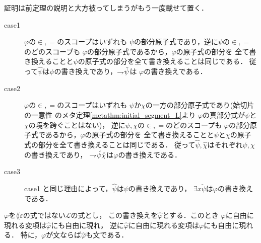 	\begin{metaprf}
		証明は前定理の説明と大方被ってしまうがもう一度載せて置く．
		\begin{description}
			\item[case1] $\varphi$の$\in,=$のスコープはいずれも
				$\psi$の部分原子式であり，逆に$\psi$の$\in,=$のどのスコープも
				$\varphi$の部分原子式であるから，$\varphi$の原子式の部分を
				全て書き換えることと$\psi$の原子式の部分を全て書き換えることは同じである．
				従って$\hat{\psi}$は$\psi$の書き換えであり，$\rightharpoondown\hspace{-0.25em} \check{\psi}$は
				$\varphi$の書き換えである．
			
			\item[case2] $\varphi$の$\in,=$のスコープはいずれも
				$\psi$か$\chi$の一方の部分原子式であり(始切片の一意性
				のメタ定理\ref{metathm:initial_segment_L}より
				$\varphi$の真部分式が$\psi$と$\chi$の境を跨ぐことはない)，
				逆に$\psi,\chi$の$\in,=$のどのスコープも
				$\varphi$の部分原子式であるから，$\varphi$の原子式の部分を
				全て書き換えることと$\psi$と$\chi$の原子式の部分を全て書き換えることは同じである．
				従って$\hat{\psi},\hat{\chi}$はそれぞれ$\psi,\chi$の書き換えであり，
				$\rightharpoondown\hspace{-0.25em} \check{\psi} \check{\chi}$は$\varphi$の書き換えである．
				
			\item[case3] case1 と同じ理由によって，$\hat{\psi}$は$\psi$の書き換えであり，
				$\exists x \check{\psi}$は$\varphi$の書き換えである．
				\QED
		\end{description}
	\end{metaprf}
	
	\begin{screen}
		\begin{metathm}[書き換え後も自由な変項は増減しない]
		\label{metathm:variables_unchanged_after_rewriting}
			$\varphi$を$\lang{\varepsilon}$の式ではない$\mathcal{L}$の式とし，
			この書き換えを$\hat{\varphi}$とする．このとき
			$\varphi$に自由に現れる変項は$\hat{\varphi}$にも自由に現れ，
			逆に$\hat{\varphi}$に自由に現れる変項は$\varphi$にも自由に現れる．
			特に，$\varphi$が文ならば$\hat{\varphi}$も文である．
		\end{metathm}
	\end{screen}
	
